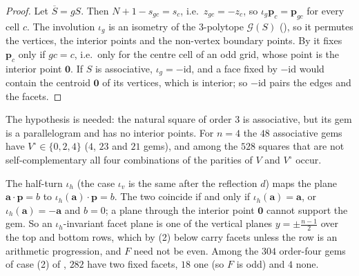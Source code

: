 \begin{proof}
Let $\overline S=gS$. Then $N+1-s_{gc}=s_c$, i.e.\ $z_{gc}=-z_c$, so $\iota_g\mathbf p_c=\mathbf p_{gc}$ for every cell $c$.
The involution $\iota_g$ is an isometry of the $3$-polytope $\mathcal G(S)$ (), so it permutes the vertices, the interior points and the non-vertex boundary points.
By  it fixes $\mathbf p_c$ only if $gc=c$, i.e.\ only for the centre cell of an odd grid, whose point is the interior point $\mathbf 0$.
If $S$ is associative, $\iota_g=-\mathrm{id}$, and a face fixed by $-\mathrm{id}$ would contain the centroid $\mathbf 0$ of its vertices, which is interior; so $-\mathrm{id}$ pairs the edges and the facets.
\end{proof}

The hypothesis is needed: the natural square of order $3$ is associative, but its gem is a parallelogram and has no interior points.
For $n=4$ the $48$ associative gems have $V^\circ\in\{0,2,4\}$ ($4$, $23$ and $21$ gems), and among the $528$ squares that are not self-complementary all four combinations of the parities of $V$ and $V^\circ$ occur.

\begin{remark}
\label{rem:facet-orbits}
The half-turn $\iota_h$ (the case $\iota_v$ is the same after the reflection $d$) maps the plane $\mathbf a\cdot\mathbf p=b$ to $\iota_h(\mathbf a)\cdot\mathbf p=b$. The two coincide if and only if $\iota_h(\mathbf a)=\mathbf a$, or $\iota_h(\mathbf a)=-\mathbf a$ and $b=0$; a plane through the interior point $\mathbf 0$ cannot support the gem. So an $\iota_h$-invariant facet plane is one of the vertical planes $y=\pm\frac{n-1}2$ over the top and bottom rows, which by (2) below carry facets unless the row is an arithmetic progression, and $F$ need not be even. Among the $304$ order-four gems of case (2) of , $282$ have two fixed facets, $18$ one (so $F$ is odd) and $4$ none.
\end{remark}

